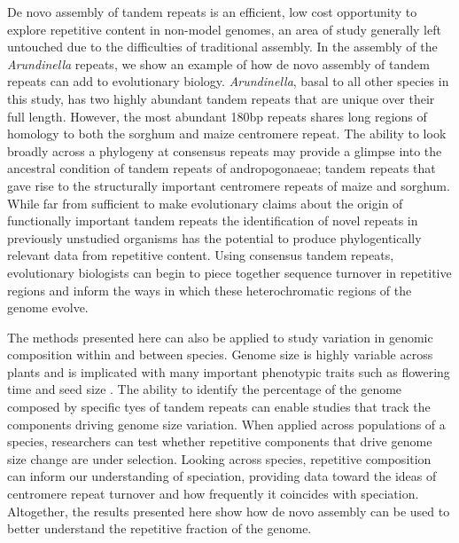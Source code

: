 \documentclass[10pt,letterpaper]{article}
\newcommand{\jri}[1]{\todo[size=\scriptsize, color=SkyBlue]{#1}}
\newcommand{\pb}[1]{\todo[size=\scriptsize, color=Bittersweet]{#1}} %
\begin{document}
De novo assembly of tandem repeats is an efficient, low cost opportunity to explore repetitive content in non-model genomes, an area of study generally left untouched due to the difficulties of traditional assembly.
In the assembly of the \emph{Arundinella} repeats, we show an example of how de novo assembly of tandem repeats can add to evolutionary biology.
\emph{Arundinella}, basal to all other species in this study, has two highly abundant tandem repeats that are unique over their full length.
However, the most abundant 180bp repeats shares long regions of homology to both the sorghum and maize centromere repeat.
The ability to look broadly across a phylogeny at consensus repeats may provide a glimpse into the ancestral condition of tandem repeats of andropogonaeae; tandem repeats that gave rise to the structurally important centromere repeats of maize and sorghum.%
While far from sufficient to make evolutionary claims about the origin of functionally important tandem repeats %
the identification of novel repeats in previously unstudied organisms has the potential to produce phylogentically relevant data from repetitive content.%
Using consensus tandem repeats, evolutionary biologists can begin to piece together sequence turnover in repetitive regions \cite{henikoff2001centromere} and inform the ways in which these heterochromatic regions of the genome evolve.

The methods presented here can also be applied to study variation in genomic composition within and between species.
Genome size is highly variable across plants \cite{kewc} and is implicated with many important phenotypic traits such as flowering time and seed size \cite{rayburn1994selection,knight2005large}.
The ability to identify the percentage of the genome composed by specific tyes of tandem repeats can enable studies that track the components driving genome size variation.
When applied across populations of a species, researchers can test whether repetitive components that drive genome size change are under selection.
Looking across species, repetitive composition can inform our understanding of speciation, providing data toward the ideas of centromere repeat turnover and how frequently it coincides with speciation.
Altogether, the results presented here show how de novo assembly can be used to better understand the repetitive fraction of the genome.
\end{document}
